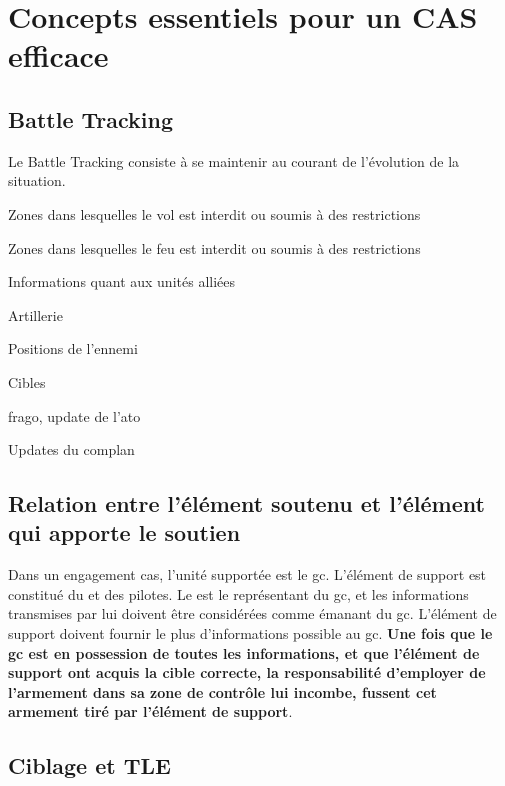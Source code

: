 \section{Concepts essentiels pour un CAS efficace}


\subsection{Battle Tracking}

Le Battle Tracking consiste à se maintenir au courant de l'évolution de la situation.

\e
	\item Zones dans lesquelles le vol est interdit ou soumis à des restrictions
	\item Zones dans lesquelles le feu est interdit ou soumis à des restrictions
	\item Informations quant aux unités alliées
	\item Artillerie
	\item Positions de l'ennemi
	\item Cibles
	\item \gls{frago}, update de l'\gls{ato}
	\item Updates du \gls{complan}
\ed

\subsection{Relation entre l'élément soutenu et l'élément qui apporte le soutien}


Dans un engagement \gls{cas}, l'unité supportée est le \gls{gc}. L'élément de support est constitué du \ja{} et des pilotes. Le \ja{} est le représentant du \gls{gc}, et les informations transmises par lui doivent être considérées comme émanant du \gls{gc}. L'élément de support doivent fournir le plus d'informations possible au \gls{gc}. \textbf{Une fois que le \gls{gc} est en possession de toutes les informations, et que l'élément de support ont acquis la cible correcte, la responsabilité d'employer de l'armement dans sa zone de contrôle lui incombe, fussent cet armement tiré par l'élément de support}.

\subsection{Ciblage et TLE}

